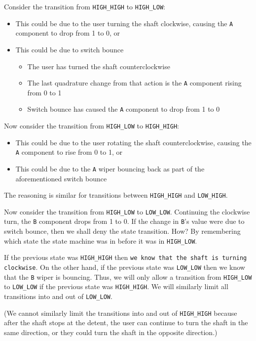 Consider the transition from \texttt{HIGH\_HIGH} to \texttt{HIGH\_LOW}:
\begin{itemize}
    \item This could be due to the user turning the shaft clockwise, causing the \texttt{A} component to drop from 1 to 0, or
    \item This could be due to switch bounce
        \begin{itemize}
            \item The user has turned the shaft counterclockwise
            \item The last quadrature change from that action is the \texttt{A} component rising from 0 to 1
            \item Switch bounce has caused the \texttt{A} component to drop from 1 to 0
        \end{itemize}
\end{itemize}
Now consider the transition from \texttt{HIGH\_LOW} to \texttt{HIGH\_HIGH}:
\begin{itemize}
    \item This could be due to the user rotating the shaft counterclockwise, causing the \texttt{A} component to rise from 0 to 1, or
    \item This could be due to the \texttt{A} wiper bouncing back as part of the aforementioned switch bounce
\end{itemize}
The reasoning is similar for transitions between \texttt{HIGH\_HIGH} and \texttt{LOW\_HIGH}.

Now consider the transition from \texttt{HIGH\_LOW} to \texttt{LOW\_LOW}.
Continuing the clockwise turn, the \texttt{B} component drops from 1 to 0.
If the change in \texttt{B}'s value were due to switch bounce, then we shall deny the state transition.
How?
By remembering which state the state machine was in before it was in \texttt{HIGH\_LOW}.

If the previous state was \texttt{HIGH\_HIGH} then \texttt{we know that the shaft is turning clockwise}.
On the other hand, if the previous state was \texttt{LOW\_LOW} then we know that the \texttt{B} wiper is bouncing.
Thus, we will only allow a transition from \texttt{HIGH\_LOW} to \texttt{LOW\_LOW} if the previous state was \texttt{HIGH\_HIGH}.
We will similarly limit all transitions into and out of \texttt{LOW\_LOW}.

(We cannot similarly limit the transitions into and out of \texttt{HIGH\_HIGH} because after the shaft stops at the detent, the user can continue to turn the shaft in the same direction, or they could turn the shaft in the opposite direction.)

